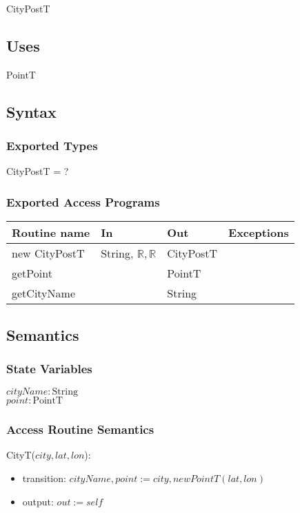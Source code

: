 \documentclass[12pt]{article}
\begin{document}
CityPostT

\subsection* {Uses}

PointT

\subsection* {Syntax}

\subsubsection* {Exported Types}

CityPostT = ?


\subsubsection* {Exported Access Programs}

\begin{tabular}{| l | l | l | l |}
\hline
\textbf{Routine name} & \textbf{In} & \textbf{Out} & \textbf{Exceptions}\\
\hline
new CityPostT & String, $\mathbb{R}, \mathbb{R}$ & CityPostT & \\
\hline
getPoint & ~ & PointT & \\
\hline
getCityName &~ & String & \\
\hline
\end{tabular}

\subsection* {Semantics}

\subsubsection* {State Variables}

$\mathit{cityName}: \text{String}$\\
$\mathit{point}: \text{PointT}$

\subsubsection* {Access Routine Semantics}

CityT($city, lat, lon$):
\begin{itemize}
\item transition: $cityName, point := city, new PointT(lat,lon)$ 

\item output: $\mathit{out} := \mathit{self}$
\end{itemize}
\end{document}
